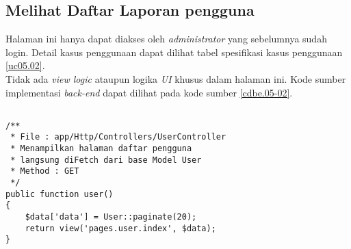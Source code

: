 \subsection{Melihat Daftar Laporan pengguna}
Halaman ini hanya dapat diakses oleh \textit{administrator} yang sebelumnya sudah login. Detail kasus penggunaan dapat dilihat tabel spesifikasi kasus penggunaan \ref{uc05.02}.\\
\indent Tidak ada \textit{view logic} ataupun logika \textit{UI} khusus dalam halaman ini. Kode sumber implementasi \textit{back-end} dapat dilihat pada kode sumber \ref{cdbe.05-02}.

\begin{lstlisting}[label=cdbe.05-02,style=php,caption=Kode Sumber Antarmuka Registrasi]

/** 
 * File : app/Http/Controllers/UserController
 * Menampilkan halaman daftar pengguna
 * langsung diFetch dari base Model User
 * Method : GET
 */
public function user()
{
    $data['data'] = User::paginate(20);
    return view('pages.user.index', $data);
}
\end{lstlisting}
      
      
